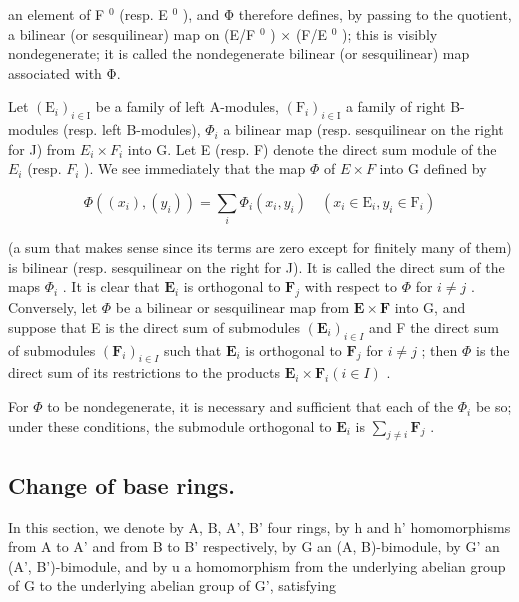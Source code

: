 an element of F \(^{0}\) (resp. E \(^{0}\) ), and Φ therefore defines, by passing to the quotient, a bilinear (or sesquilinear) map on (E/F \(^{0}\) ) × (F/E \(^{0}\) ); this is visibly nondegenerate; it is called the nondegenerate bilinear (or sesquilinear) map associated with Φ.

Let \((\mathrm{E}_{i})_{i\in\mathrm{I}}\) be a family of left A-modules, \((\mathrm{F}_{i})_{i\in\mathrm{I}}\) a family of right B-modules (resp. left B-modules), \(\Phi_{i}\) a bilinear map (resp. sesquilinear on the right for J) from \(E_{i}\times F_{i}\) into G. Let E (resp. F) denote the direct sum module of the \(E_{i}\) (resp. \(F_{i}\) ). We see immediately that the map \(\Phi\) of \(E\times F\) into G defined by

\[
\Phi ((x _ {i}), (y _ {i})) = \sum_ {i} \Phi_ {i} (x _ {i}, y _ {i}) \quad (x _ {i} \in \mathrm{E} _ {i}, y _ {i} \in \mathrm{F} _ {i})\tag{10}
\]

(a sum that makes sense since its terms are zero except for finitely many of them) is bilinear (resp. sesquilinear on the right for J). It is called the direct sum of the maps \(\Phi_{i}\) . It is clear that \(\mathbf{E}_{i}\) is orthogonal to \(\mathbf{F}_{j}\) with respect to \(\Phi\) for \(i \neq j\) . Conversely, let \(\Phi\) be a bilinear or sesquilinear map from \(\mathbf{E} \times \mathbf{F}\) into G, and suppose that E is the direct sum of submodules \((\mathbf{E}_{i})_{i \in I}\) and F the direct sum of submodules \((\mathbf{F}_{i})_{i \in I}\) such that \(\mathbf{E}_{i}\) is orthogonal to \(\mathbf{F}_{j}\) for \(i \neq j\) ; then \(\Phi\) is the direct sum of its restrictions to the products \(\mathbf{E}_{i} \times \mathbf{F}_{i} (i \in I)\) .

For \(\Phi\) to be nondegenerate, it is necessary and sufficient that each of the \(\Phi_{i}\) be so; under these conditions, the submodule orthogonal to \(\mathbf{E}_{i}\) is \(\sum_{j\neq i}\mathbf{F}_{j}\) .

\subsection{Change of base rings.}

In this section, we denote by A, B, A', B' four rings, by h and h' homomorphisms from A to A' and from B to B' respectively, by G an (A, B)-bimodule, by G' an (A', B')-bimodule, and by u a homomorphism from the underlying abelian group of G to the underlying abelian group of G', satisfying


